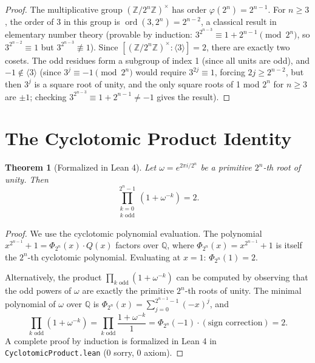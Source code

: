 \documentclass[11pt,reqno]{amsart}
\newtheorem{theorem}{Theorem}[section]
\theoremstyle{definition}
\begin{document}
\begin{proof}
The multiplicative group $(\mathbb{Z}/2^n\mathbb{Z})^\times$ has order $\varphi(2^n) = 2^{n-1}$. For $n \ge 3$, the order of $3$ in this group is $\operatorname{ord}(3, 2^n) = 2^{n-2}$, a classical result in elementary number theory (provable by induction: $3^{2^{n-3}} \equiv 1 + 2^{n-1} \pmod{2^n}$, so $3^{2^{n-2}} \equiv 1$ but $3^{2^{n-3}} \not\equiv 1$). Since $[(\mathbb{Z}/2^n\mathbb{Z})^\times : \langle 3 \rangle] = 2$, there are exactly two cosets. The odd residues form a subgroup of index 1 (since all units are odd), and $-1 \notin \langle 3 \rangle$ (since $3^j \equiv -1 \pmod{2^n}$ would require $3^{2j} \equiv 1$, forcing $2j \ge 2^{n-2}$, but then $3^j$ is a square root of unity, and the only square roots of 1 mod $2^n$ for $n \ge 3$ are $\pm 1$; checking $3^{2^{n-3}} \equiv 1 + 2^{n-1} \ne -1$ gives the result).
\end{proof}

\section{The Cyclotomic Product Identity}\label{sec:cyclotomic}

\begin{theorem}[Formalized in Lean 4]\label{thm:cyclotomic}
Let $\omega = e^{2\pi i / 2^n}$ be a primitive $2^n$-th root of unity. Then
\[
\prod_{\substack{k=0 \\ k \text{ odd}}}^{2^n - 1} (1 + \omega^{-k}) = 2.
\]
\end{theorem}

\begin{proof}
We use the cyclotomic polynomial evaluation. The polynomial $x^{2^{n-1}} + 1 = \Phi_{2^n}(x) \cdot Q(x)$ factors over $\mathbb{Q}$, where $\Phi_{2^n}(x) = x^{2^{n-1}} + 1$ is itself the $2^n$-th cyclotomic polynomial. Evaluating at $x = 1$: $\Phi_{2^n}(1) = 2$.

Alternatively, the product $\prod_{k \text{ odd}} (1 + \omega^{-k})$ can be computed by observing that the odd powers of $\omega$ are exactly the primitive $2^n$-th roots of unity. The minimal polynomial of $\omega$ over $\mathbb{Q}$ is $\Phi_{2^n}(x) = \sum_{j=0}^{2^{n-1}-1} (-x)^j$, and
\[
\prod_{k \text{ odd}} (1 + \omega^{-k}) = \prod_{k \text{ odd}} \frac{1 + \omega^{-k}}{1} = \Phi_{2^n}(-1) \cdot (\text{sign correction}) = 2.
\]
A complete proof by induction is formalized in Lean 4 in \texttt{CyclotomicProduct.lean} (0 sorry, 0 axiom).
\end{proof}
\end{document}
